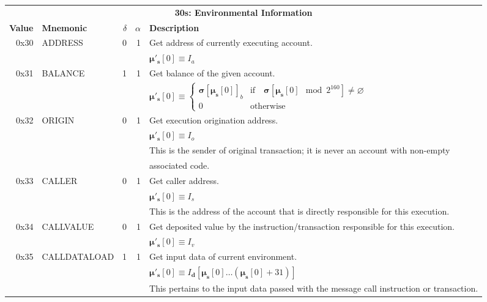 \documentclass[9pt,oneside]{amsart}
\begin{document}
\begin{tabular*}{\columnwidth}[h]{rlrrl}
\toprule
\multicolumn{5}{c}{\textbf{30s: Environmental Information}} \vspace{5pt} \\
\textbf{Value} & \textbf{Mnemonic} & $\delta$ & $\alpha$ & \textbf{Description} \vspace{5pt} \\
0x30 & {\small ADDRESS} & 0 & 1 & Get address of currently executing account. \\
&&&& $\boldsymbol{\mu}'_\mathbf{s}[0] \equiv I_a$ \\
\midrule
0x31 & {\small BALANCE} & 1 & 1 & Get balance of the given account. \\
&&&& $\boldsymbol{\mu}'_\mathbf{s}[0] \equiv \begin{cases}\boldsymbol{\sigma}[\boldsymbol{\mu}_\mathbf{s}[0]]_b& \text{if} \quad \boldsymbol{\sigma}[\boldsymbol{\mu}_\mathbf{s}[0] \mod 2^{160}] \neq \varnothing\\0&\text{otherwise}\end{cases}$ \\
\midrule
0x32 & {\small ORIGIN} & 0 & 1 & Get execution origination address. \\
&&&& $\boldsymbol{\mu}'_\mathbf{s}[0] \equiv I_o$ \\
&&&& This is the sender of original transaction; it is never an account with non-empty \\
&&&& associated code. \\
\midrule
0x33 & {\small CALLER} & 0 & 1 & Get caller address. \\
&&&& $\boldsymbol{\mu}'_\mathbf{s}[0] \equiv I_s$ \\
&&&& This is the address of the account that is directly responsible for this execution. \\
\midrule
0x34 & {\small CALLVALUE} & 0 & 1 & Get deposited value by the instruction/transaction responsible for this execution. \\
&&&& $\boldsymbol{\mu}'_\mathbf{s}[0] \equiv I_v$ \\
\midrule
0x35 & {\small CALLDATALOAD} & 1 & 1 & Get input data of current environment. \\
&&&& $\boldsymbol{\mu}'_\mathbf{s}[0] \equiv I_\mathbf{d}[ \boldsymbol{\mu}_\mathbf{s}[0] \dots (\boldsymbol{\mu}_\mathbf{s}[0] + 31) ]$ \\
&&&& This pertains to the input data passed with the message call instruction or transaction. \\

\end{tabular*}
\end{document}
